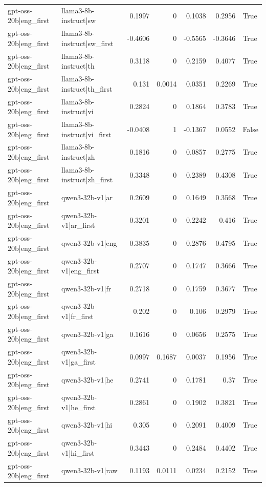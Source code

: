 \begin{table}
\begin{tabular}{l l r r r r l}
gpt-oss-20b|eng_first & llama3-8b-instruct|sw & 0.1997 & 0 & 0.1038 & 0.2956 & True \\
gpt-oss-20b|eng_first & llama3-8b-instruct|sw_first & -0.4606 & 0 & -0.5565 & -0.3646 & True \\
gpt-oss-20b|eng_first & llama3-8b-instruct|th & 0.3118 & 0 & 0.2159 & 0.4077 & True \\
gpt-oss-20b|eng_first & llama3-8b-instruct|th_first & 0.131 & 0.0014 & 0.0351 & 0.2269 & True \\
gpt-oss-20b|eng_first & llama3-8b-instruct|vi & 0.2824 & 0 & 0.1864 & 0.3783 & True \\
gpt-oss-20b|eng_first & llama3-8b-instruct|vi_first & -0.0408 & 1 & -0.1367 & 0.0552 & False \\
gpt-oss-20b|eng_first & llama3-8b-instruct|zh & 0.1816 & 0 & 0.0857 & 0.2775 & True \\
gpt-oss-20b|eng_first & llama3-8b-instruct|zh_first & 0.3348 & 0 & 0.2389 & 0.4308 & True \\
gpt-oss-20b|eng_first & qwen3-32b-v1|ar & 0.2609 & 0 & 0.1649 & 0.3568 & True \\
gpt-oss-20b|eng_first & qwen3-32b-v1|ar_first & 0.3201 & 0 & 0.2242 & 0.416 & True \\
gpt-oss-20b|eng_first & qwen3-32b-v1|eng & 0.3835 & 0 & 0.2876 & 0.4795 & True \\
gpt-oss-20b|eng_first & qwen3-32b-v1|eng_first & 0.2707 & 0 & 0.1747 & 0.3666 & True \\
gpt-oss-20b|eng_first & qwen3-32b-v1|fr & 0.2718 & 0 & 0.1759 & 0.3677 & True \\
gpt-oss-20b|eng_first & qwen3-32b-v1|fr_first & 0.202 & 0 & 0.106 & 0.2979 & True \\
gpt-oss-20b|eng_first & qwen3-32b-v1|ga & 0.1616 & 0 & 0.0656 & 0.2575 & True \\
gpt-oss-20b|eng_first & qwen3-32b-v1|ga_first & 0.0997 & 0.1687 & 0.0037 & 0.1956 & True \\
gpt-oss-20b|eng_first & qwen3-32b-v1|he & 0.2741 & 0 & 0.1781 & 0.37 & True \\
gpt-oss-20b|eng_first & qwen3-32b-v1|he_first & 0.2861 & 0 & 0.1902 & 0.3821 & True \\
gpt-oss-20b|eng_first & qwen3-32b-v1|hi & 0.305 & 0 & 0.2091 & 0.4009 & True \\
gpt-oss-20b|eng_first & qwen3-32b-v1|hi_first & 0.3443 & 0 & 0.2484 & 0.4402 & True \\
gpt-oss-20b|eng_first & qwen3-32b-v1|raw & 0.1193 & 0.0111 & 0.0234 & 0.2152 & True \\

\end{tabular}
\end{table}
